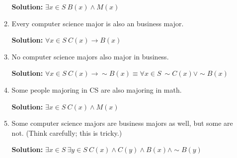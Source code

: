 \documentclass[12pt, letterpaper]{report}
\newcommand{\nott}{{\sim}}
\begin{document}
\begin{enumerate}
\begin{enumerate}
                \textbf{Solution:} $\exists x \in S \ B(x) \land M(x)$
                
                \item Every computer science major is also an business major.
                
                \textbf{Solution:} $\forall x \in S \ C(x) \to B(x)$
                
                \item No computer science majors also major in business.
                
                \textbf{Solution:} $\forall x \in S \ C(x) \to \nott B(x) \equiv \forall x \in S \ \nott C(x) \lor \nott B(x)$
                
                \item Some people majoring in CS are also majoring in math.
                
                \textbf{Solution:} $\exists x \in S \ C(x) \land M(x)$
                
                \item Some computer science majors are business majors as well, but some are not.  (Think carefully; this is tricky.)
                
                \textbf{Solution:} $\exists x \in S \ \exists y \in S \ C(x) \land C(y) \land B(x) \land \nott B(y)$

                
                
        \end{enumerate}
        


\end{enumerate}
\end{document}
